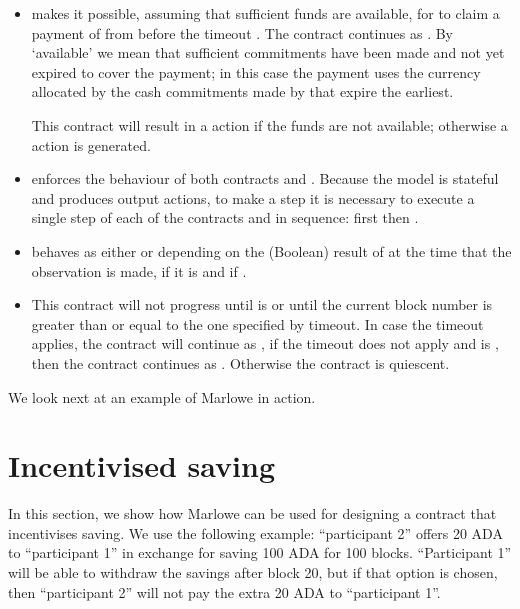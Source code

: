 \documentclass[
      acmsmall
    , screen
    , review=true
  ]{acmart}
\begin{document}
\begin{itemize}
\item {} makes it possible, assuming that sufficient funds are available, for 
 to claim  a payment of  from  before the timeout 
. The contract continues as . By `available' we mean that sufficient commitments have 
been made and  not yet expired to cover the payment; in this case the payment  uses the currency allocated by the cash 
commitments made by  that expire the earliest.

 This contract will result in a  action if the funds are not available; otherwise a  action is generated.

\item {} enforces the behaviour of both contracts  and . Because the model is stateful and produces output actions, to make a step it is necessary to execute a single step of each of  the contracts  and  in sequence: first  then .

\item {} behaves as either  or  depending on the (Boolean) result of  at the time that the observation is made,  if it is  and  if .

\item {} This contract will not progress until  is  or until the current block number is greater than or equal to the one specified by timeout. In case the timeout applies, the contract will continue as , if the timeout does not apply and  is , then the contract continues as . Otherwise the contract is quiescent.
\end{itemize}
We look next at an example of Marlowe in action.


\section{Incentivised saving}
\label{section:example}

In this section, we show how Marlowe can be used for designing a contract that incentivises saving. We use the 
following example: ``participant 2'' offers 20 ADA to ``participant 1'' in exchange for saving 100 ADA for 100 blocks. 
``Participant 1'' will be able to withdraw the savings after block 20, but if that option is chosen, then ``participant 
2'' will not pay the extra 20 ADA to ``participant 1''.
\end{document}
